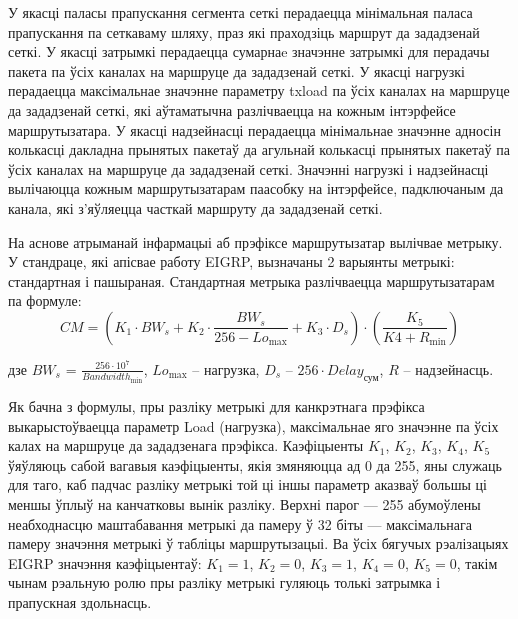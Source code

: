 У якасці паласы прапускання сегмента сеткі перадаецца мінімальная
паласа прапускання па сеткаваму шляху, праз які праходзіць маршрут да зададзенай сеткі. У якасці затрымкі перадаецца сумарнаe значэнне затрымкі
для перадачы пакета па ўсіх каналах на маршруце да зададзенай сеткі. У якасці нагрузкі перадаецца максімальнае значэнне параметру txload па ўсіх каналах на маршруце да зададзенай сеткі, які аўтаматычна разлічваецца
на кожным інтэрфейсе маршрутызатара. У якасці надзейнасці перадаецца мінімальнае
значэнне адносін колькасці дакладна прынятых пакетаў да агульнай колькасці прынятых пакетаў па ўсіх каналах на маршруце да зададзенай сеткі. Значэнні
нагрузкі і надзейнасці вылічаюцца кожным маршрутызатарам паасобку
на інтэрфейсе, падключаным да канала, які з'яўляецца часткай маршруту
да зададзенай сеткі.

На аснове атрыманай інфармацыі аб прэфіксе маршрутызатар вылічвае метрыку.
У стандраце, які апісвае работу EIGRP, вызначаны 2 варыянты метрыкі:
стандартная і пашыраная. Стандартная метрыка разлічваецца маршрутызатарам
па формуле:
\begin{equation}
    CM = \left(K_1 \cdot BW_s + K_2 \cdot \frac{BW_s}{256 -Lo_\text{max}} + K_3 \cdot D_s\right) \cdot \left(\frac{K_5}{K4 + R_\text{min}}\right)
\end{equation}
\begin{Explanation}
    \item[дзе] $BW_s$ = $\frac{256 \cdot 10^7}{Bandwidth_\text{min}}$,
    $Lo_\text{max}$ -- нагрузка,
    $D_s$ -- $256 \cdot Delay_\text{сум}$,
    $R$ -- надзейнасць.
\end{Explanation}

Як бачна з формулы, пры разліку метрыкі для канкрэтнага прэфікса
выкарыстоўваецца параметр Load (нагрузка), максімальнае яго значэнне па ўсіх калах на маршруце да зададзенага прэфікса.
Каэфіцыенты $K_1$, $K_2$, $K_3$, $K_4$, $K_5$ ўяўляюць сабой вагавыя
каэфіцыенты, якія змяняюцца ад 0 да 255, яны служаць для таго, каб падчас разліку метрыкі
той ці іншы параметр аказваў большы ці меншы ўплыў на канчатковы
вынік разліку. Верхні парог --- 255 абумоўлены неабходнасцю маштабавання метрыкі да памеру ў 32 біты --- максімальнага памеру значэння
метрыкі ў табліцы маршрутызацыі. Ва ўсіх бягучых рэалізацыях EIGRP значэння
каэфіцыентаў: $K_1 = 1$, $K_2 = 0$, $K_3 = 1$, $K_4 = 0$, $K_5 = 0$, такім чынам рэальную ролю пры разліку
метрыкі гуляюць толькі затрымка і прапускная здольнасць.

